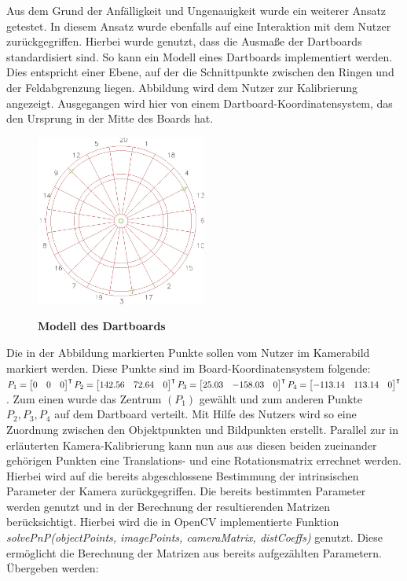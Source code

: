Aus dem Grund der Anfälligkeit und Ungenauigkeit wurde ein weiterer Ansatz getestet.
In diesem Ansatz wurde ebenfalls auf eine Interaktion mit dem Nutzer zurückgegriffen.
Hierbei wurde genutzt, dass die Ausmaße der Dartboards standardisiert sind. So kann ein Modell eines Dartboards implementiert werden. Dies entspricht einer Ebene, auf der die Schnittpunkte zwischen den Ringen und der Feldabgrenzung liegen. Abbildung  wird dem Nutzer zur Kalibrierung angezeigt. Ausgegangen wird hier von einem Dartboard-Koordinatensystem, das den Ursprung in der Mitte des Boards hat.  
\begin{figure}
\centering
\includegraphics[width=0.5\textwidth]{media/confighints.jpg}\\
\caption{\textbf{Modell des Dartboards}}
\label{Fig:dartmodel}
\end{figure}
Die in der Abbildung markierten Punkte sollen vom Nutzer im Kamerabild markiert werden. 
Diese Punkte sind im Board-Koordinatensystem folgende:
$P_1 = \begin{bmatrix}0& 0& 0 \\\end{bmatrix}^\intercal 
P_2 = \begin{bmatrix}142.56& 72.64& 0 \\\end{bmatrix}^\intercal\\
P_3 = \begin{bmatrix}25.03& -158.03& 0 \\\end{bmatrix}^\intercal
P_4 = \begin{bmatrix}-113.14& 113.14& 0 \\\end{bmatrix}^\intercal$.
Zum einen wurde das Zentrum $(P_1)$ gewählt und zum anderen Punkte $P_2,P_3,P_4$ auf dem Dartboard verteilt. Mit Hilfe des Nutzers wird so eine Zuordnung zwischen den Objektpunkten und Bildpunkten erstellt. Parallel zur in  erläuterten Kamera-Kalibrierung kann nun aus aus diesen beiden zueinander gehörigen Punkten eine Translations- und eine Rotationsmatrix errechnet werden. Hierbei wird auf die bereits abgeschlossene Bestimmung der intrinsischen Parameter der Kamera zurückgegriffen. Die bereits bestimmten Parameter werden genutzt und in der Berechnung der resultierenden Matrizen berücksichtigt. Hierbei wird die in OpenCV implementierte Funktion \textit{solvePnP(objectPoints, imagePoints, cameraMatrix, distCoeffs)} genutzt. Diese ermöglicht die Berechnung der Matrizen aus bereits aufgezählten Parametern. Übergeben werden:
